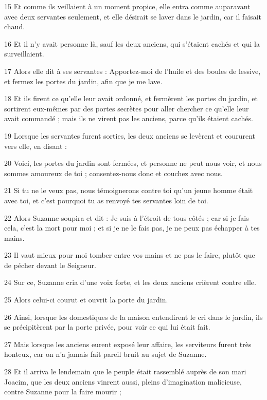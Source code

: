 \par 15 Et comme ils veillaient à un moment propice, elle entra comme auparavant avec deux servantes seulement, et elle désirait se laver dans le jardin, car il faisait chaud.
\par 16 Et il n'y avait personne là, sauf les deux anciens, qui s'étaient cachés et qui la surveillaient.
\par 17 Alors elle dit à ses servantes : Apportez-moi de l'huile et des boules de lessive, et fermez les portes du jardin, afin que je me lave.
\par 18 Et ils firent ce qu'elle leur avait ordonné, et fermèrent les portes du jardin, et sortirent eux-mêmes par des portes secrètes pour aller chercher ce qu'elle leur avait commandé ; mais ils ne virent pas les anciens, parce qu'ils étaient cachés.
\par 19 Lorsque les servantes furent sorties, les deux anciens se levèrent et coururent vers elle, en disant :
\par 20 Voici, les portes du jardin sont fermées, et personne ne peut nous voir, et nous sommes amoureux de toi ; consentez-nous donc et couchez avec nous.
\par 21 Si tu ne le veux pas, nous témoignerons contre toi qu'un jeune homme était avec toi, et c'est pourquoi tu as renvoyé tes servantes loin de toi.
\par 22 Alors Suzanne soupira et dit : Je suis à l'étroit de tous côtés ; car si je fais cela, c'est la mort pour moi ; et si je ne le fais pas, je ne peux pas échapper à tes mains.
\par 23 Il vaut mieux pour moi tomber entre vos mains et ne pas le faire, plutôt que de pécher devant le Seigneur.
\par 24 Sur ce, Suzanne cria d'une voix forte, et les deux anciens crièrent contre elle.
\par 25 Alors celui-ci courut et ouvrit la porte du jardin.
\par 26 Ainsi, lorsque les domestiques de la maison entendirent le cri dans le jardin, ils se précipitèrent par la porte privée, pour voir ce qui lui était fait.
\par 27 Mais lorsque les anciens eurent exposé leur affaire, les serviteurs furent très honteux, car on n'a jamais fait pareil bruit au sujet de Suzanne.
\par 28 Et il arriva le lendemain que le peuple était rassemblé auprès de son mari Joacim, que les deux anciens vinrent aussi, pleins d'imagination malicieuse, contre Suzanne pour la faire mourir ;
